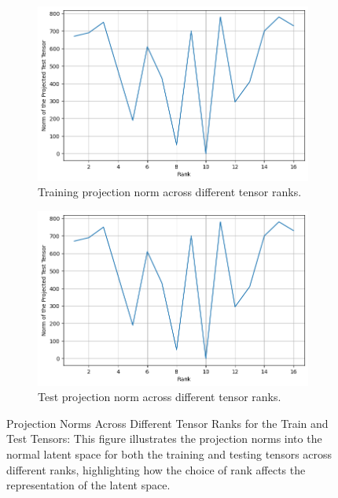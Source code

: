 \documentclass[pdflatex,sn-mathphys-num]{sn-jnl}
\theoremstyle{thmstyleone}
\theoremstyle{thmstyletwo}
\theoremstyle{thmstylethree}
\begin{document}
\begin{figure}[H]
    \centering
    \begin{subfigure}[t]{0.48\linewidth}
        \centering
        \includegraphics[width=\linewidth]{projection test plot.png}
        \caption{Training projection norm across different tensor ranks.}
        \label{fig:train-error}
    \end{subfigure}
    \hfill
    \begin{subfigure}[t]{0.48\linewidth}
        \centering
        \includegraphics[width=\linewidth]{projection test plot.png}
        \caption{Test projection norm across different tensor ranks.}
        \label{fig:test-error}
    \end{subfigure}
    \caption{Projection Norms Across Different Tensor Ranks for the Train and Test Tensors: This figure illustrates the projection norms into the normal latent space for both the training and testing tensors across different ranks, highlighting how the choice of rank affects the representation of the latent space.}
    \label{fig:projection-norms}
\end{figure}
\end{document}

